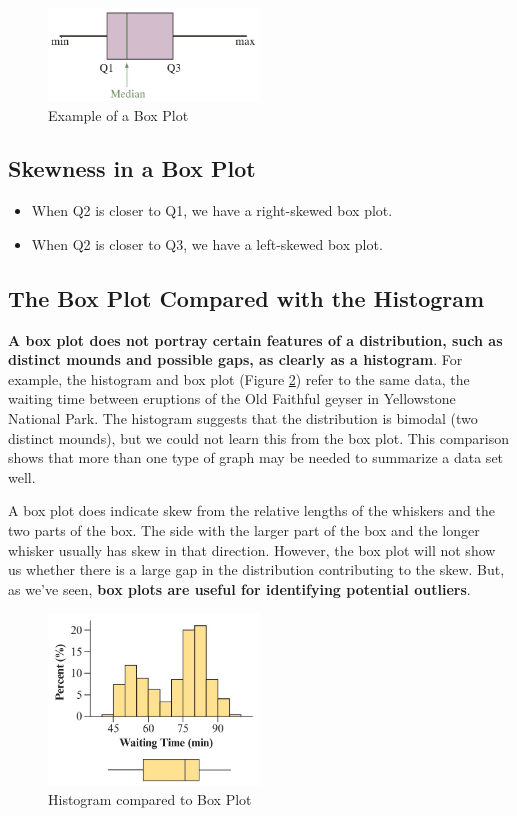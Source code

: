 \begin{figure}[h!]
\centering
\includegraphics[width=0.5\textwidth]{figures/box_plot.jpg}
\caption{Example of a Box Plot}
\label{fig:box_plot.jpg}
\end{figure}

\subsection{Skewness in a Box Plot}
\begin{itemize}
    \item When Q2 is closer to Q1, we have a right-skewed box plot.
    \item When Q2 is closer to Q3, we have a left-skewed box plot.
\end{itemize}

\subsection{The Box Plot Compared with the Histogram}

\textbf{A box plot does not portray certain features of a distribution, such as distinct mounds and possible gaps, as clearly as a histogram}. For example, the histogram and box plot (Figure \ref{fig:histogram_box_plot.jpg}) refer to the same data, the waiting time between eruptions of the Old Faithful geyser in Yellowstone National Park. The histogram suggests that the distribution is bimodal (two distinct mounds), but we could not learn this from the box plot. This comparison shows that more than one type of graph may be needed to summarize a data set well.

A box plot does indicate skew from the relative lengths of the whiskers and the two parts of the box. The side with the larger part of the box and the longer whisker usually has skew in that direction. However, the box plot will not show us whether there is a large gap in the distribution contributing to the skew. But, as we’ve seen, \textbf{box plots are useful for identifying potential outliers}. 

\begin{figure}[h!]
\centering
\includegraphics[width=0.5\textwidth]{figures/histogram_box_plot.jpg}
\caption{Histogram compared to Box Plot}
\label{fig:histogram_box_plot.jpg}
\end{figure}




 

 